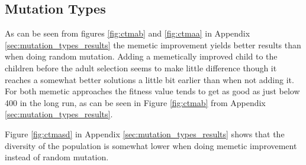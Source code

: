 
\subsection{Mutation Types} %
\label{sub:mutation_types}

As can be seen from figures \ref{fig:ctmab} and \ref{fig:ctmaa} in Appendix \ref{sec:mutation_types_results} the memetic improvement yields better results than when doing random mutation. Adding a memetically improved child to the children before the adult selection seems to make little difference though it reaches a somewhat better solutions a little bit earlier than when not adding it. For both memetic approaches the fitness value tends to get as good as just below 400 in the long run, as can be seen in Figure \ref{fig:ctmab} from Appendix \ref{sec:mutation_types_results}.

Figure \ref{fig:ctmasd} in Appendix \ref{sec:mutation_types_results} shows that the diversity of the population is somewhat lower when doing memetic improvement instead of random mutation.





